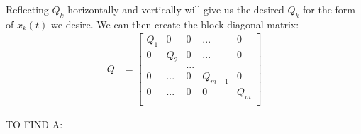 \documentclass[11pt]{article}
\begin{document}
Reflecting $Q_k$ horizontally and vertically will give us the desired $Q_k$ for the form of $x_k(t)$ we desire. We can then create the block diagonal matrix:
\begin{align}
\label{eqn: Qkeyframes} Q &= 
\begin{bmatrix}
  Q_1 & 0 & 0 & ... & 0 \\
  0 & Q_2 & 0 & ... & 0 \\
  & & ... & &  \\
  0 & ... & 0 & Q_{m-1} & 0 \\
  0 & ... & 0 & 0 & Q_m \\ 
 \end{bmatrix}
\end{align}



\mbox{} \newline
\mbox{} \newline
TO FIND A: \newline
\end{document}
